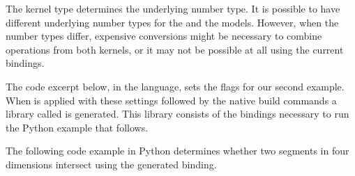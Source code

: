 \begin{table}[!htp]
  \caption{$d$-dimensional Kernel dimension tag options.}
  \centering{}
 \label{tab:kerd:dim}
\end{table}

The kernel type determines the underlying number type. It is possible to have different underlying number types for the \iiDandiiiDGeometryKernelPackage{} and the \dDGeometryKernelPackage{} models. However, when the number types differ, expensive conversions
might be necessary to combine operations from both kernels, or it may not be possible at all using the current bindings.

The code excerpt below, in the \cmake{} language, sets the \cmake{} flags for our second example. When  is applied with these settings followed by the native build commands a library called  is generated. This library consists of the bindings necessary to run the Python example that follows. 

The following code example in Python determines whether two segments in four dimensions intersect using the generated binding.
